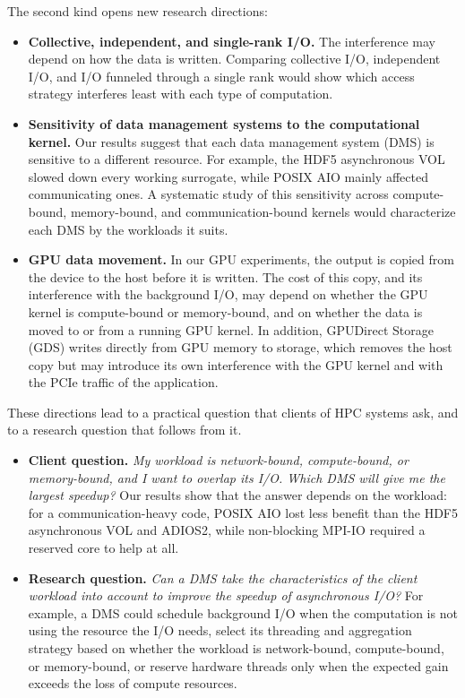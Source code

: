 The second kind opens new research directions:
\begin{itemize}
  \item \textbf{Collective, independent, and single-rank I/O.} The
        interference may depend on how the data is written. Comparing
        collective I/O, independent I/O, and I/O funneled through a single
        rank would show which access strategy interferes least with each
        type of computation.
  \item \textbf{Sensitivity of data management systems to the computational
        kernel.} Our results suggest that each data management system (DMS)
        is sensitive to a different resource. For example, the HDF5
        asynchronous VOL slowed down every working surrogate, while POSIX
        AIO mainly affected communicating ones. A systematic study of this
        sensitivity across compute-bound, memory-bound, and
        communication-bound kernels would characterize each DMS by the
        workloads it suits.
  \item \textbf{GPU data movement.} In our GPU experiments, the output is
        copied from the device to the host before it is written. The cost
        of this copy, and its interference with the background I/O, may
        depend on whether the GPU kernel is compute-bound or memory-bound,
        and on whether the data is moved to or from a running GPU kernel.
        In addition, GPUDirect Storage (GDS) writes directly from GPU memory
        to storage, which removes the host copy but may introduce its own
        interference with the GPU kernel and with the PCIe traffic of the
        application.
\end{itemize}

These directions lead to a practical question that clients of HPC systems
ask, and to a research question that follows from it.
\begin{itemize}
  \item \textbf{Client question.} \emph{My workload is network-bound,
        compute-bound, or memory-bound, and I want to overlap its I/O.
        Which DMS will give me the largest speedup?} Our results show that
        the answer depends on the workload: for a communication-heavy code,
        POSIX AIO lost less benefit than the HDF5 asynchronous VOL and
        ADIOS2, while non-blocking MPI-IO required a reserved core to help
        at all.
  \item \textbf{Research question.} \emph{Can a DMS take the
        characteristics of the client workload into account to improve the
        speedup of asynchronous I/O?} For example, a DMS could schedule
        background I/O when the computation is not using the resource the
        I/O needs, select its threading and aggregation strategy based on
        whether the workload is network-bound, compute-bound, or
        memory-bound, or reserve hardware threads only when the expected
        gain exceeds the loss of compute resources.
\end{itemize}

